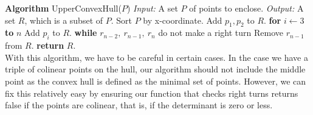 \documentclass[10pt]{article}
\begin{document}
\begin{multicols}{2}
\textbf{Algorithm} UpperConvexHull($P$) \newline 
\emph{Input:} A set $P$ of points to enclose. \newline
\emph{Output:} A set $R$, which is a subset of $P$. \newline
Sort $P$ by x-coordinate. \newline
Add $p_1, p_2$ to $R$. \newline
\textbf{for} $i \leftarrow 3$ \textbf{to} $n$ \newline
\indent Add $p_i$ to $R$. \newline
\indent \textbf{while} $r_{n-2},\ r_{n-1},\ r_n$ do not make a right turn \newline
\indent \indent Remove $r_{n-1}$ from $R$. \newline
\textbf{return} $R$. \newline \\
With this algorithm, we have to be careful in certain cases. In the case we have a triple of colinear points on the hull, our algorithm should not include the middle point as the convex hull is defined as the minimal set of points. However, we can fix this relatively easy by ensuring our function that checks right turns returns false if the points are colinear, that is, if the determinant is zero or less.

\end{multicols}
\end{document}
